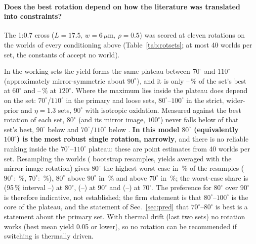 \paragraph{Does the best rotation depend on how the literature was translated into constraints?}
The 1:0.7 cross ($L=17.5$, $w=6\,\mu$m, $\rho=0.5$) was scored at eleven rotations on the worlds of every conditioning above (Table~\ref{tab:rotsets}; at most 40 worlds per set, the constants of \cite{chen2026meta} accept no world).
\begin{table}[H]\centering\scriptsize\resizebox{\textwidth}{!}{\tabRotSets}\caption{Mean hard yield of the 1:0.7 cross by rotation from the native axis, in each set of worlds; last row: for each rotation the lowest share of the set's own best rotation among the \nRotWorking{} sets in which some rotation works (best mean yield $\ge0.2$). $\theta$ and $180^\circ-\theta$ are mirror images; a ``best'' of $70^\circ$ or $110^\circ$ is the same statement.}\label{tab:rotsets}\end{table}
In the \nRotWorking{} working sets the yield forms the same plateau between $70^\circ$ and $110^\circ$ (approximately mirror-symmetric about $90^\circ$), and it is only \shareSixtyLo--\shareSixtyHi\,\% of the set's best at $60^\circ$ and \shareOneTwentyLo--\shareOneTwentyHi\,\% at $120^\circ$.
Where the maximum lies inside the plateau does depend on the set: $70^\circ$/$110^\circ$ in the primary and loose sets, $80^\circ$--$100^\circ$ in the strict, wider-prior and $\eta=1.3$ sets, $90^\circ$ with isotropic oxidation.
Measured against the best rotation of each set, $80^\circ$ (and its mirror image, $100^\circ$) never falls below \rotWorstEightZero{} of that set's best, $90^\circ$ below \rotWorstNineZero{} and $70^\circ$/$110^\circ$ below \rotWorstSevenZero{}.
\textbf{In this model $80^\circ$ (equivalently $100^\circ$) is the most robust single rotation, narrowly}, and there is no reliable ranking inside the $70^\circ$--$110^\circ$ plateau: these are point estimates from 40 worlds per set. Resampling the worlds (\nBootRot{} bootstrap resamples, yields averaged with the mirror-image rotation) gives $80^\circ$ the highest worst case in \pHighestEighty\,\% of the resamples ($90^\circ$: \pHighestNinety\,\%, $70^\circ$: \pHighestSeventy\,\%), $80^\circ$ above $90^\circ$ in \pEightyAboveNinety\,\% and above $70^\circ$ in \pEightyAboveSeventy\,\%; the worst-case share is \worstMeanEighty{} (95\,\% interval \worstLoEighty--\worstHiEighty) at $80^\circ$, \worstMeanNinety{} (\worstLoNinety--\worstHiNinety) at $90^\circ$ and \worstMeanSeventy{} (\worstLoSeventy--\worstHiSeventy) at $70^\circ$. The preference for $80^\circ$ over $90^\circ$ is therefore indicative, not established; the firm statement is that $80^\circ$--$100^\circ$ is the core of the plateau, and the statement of Sec.~\ref{sec:pred} that $70^\circ$--$80^\circ$ is best is a statement about the primary set.
With thermal drift (last two sets) no rotation works (best mean yield 0.05 or lower), so no rotation can be recommended if switching is thermally driven.
